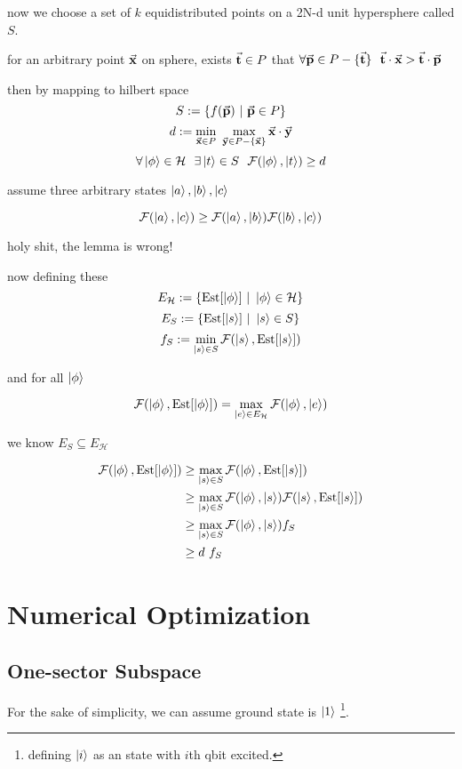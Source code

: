 \documentclass{article}
\DeclareMathOperator*{\est}{Est}
\begin{document}
now we choose a set of $k$ equidistributed points on a 2N-d unit hypersphere called $S$.

for an arbitrary point $\va{x}$ on sphere, exists $\va{t} \in P$ that $\forall \va{p} \in P - \{\va{t}\} ~~ \va{t}\cdot\va{x} > \va{t}\cdot \va{p}$

then by mapping to hilbert space
\[ S := \{ f(\va{p}) ~|~ \va{p} \in P \} \]
\[ d := \min_{\va{x} \in P} ~\max_{\va{y} \in P - \{\va{x}\}} \va{x}\cdot\va{y} \]
\[ \forall \ket{\phi} \in \mathcal{H} ~~ \exists \ket{t} \in S ~~ \mathcal{F}(\ket{\phi}, \ket{t}) \ge d \]

\begin{lemma}
assume three arbitrary states $\ket{a},\ket{b},\ket{c}$

\[ \mathcal{F}(\ket{a},\ket{c}) \ge \mathcal{F}(\ket{a},\ket{b})\mathcal{F}(\ket{b},\ket{c})\]
\end{lemma}

holy shit, the lemma is wrong!

now defining these
\[ E_{\mathcal{H}} := \{\est[\ket{\phi}] ~|~ \ket{\phi} \in \mathcal{H} \} \]
\[ E_S := \{\est[\ket{s}] ~|~ \ket{s} \in S \} \]
\[ f_S := \min_{\ket{s} \in S} \mathcal{F}(\ket{s}, \est[\ket{s}]) \] 

and for all $\ket{\phi}$

\[ \mathcal{F}(\ket{\phi}, \est[\ket{\phi}]) = \max_{\ket{e} \in E_{\mathcal{H}}} \mathcal{F}(\ket{\phi}, \ket{e})\]

we know $E_S \subseteq E_{\mathcal{H}}$

\begin{align*} \mathcal{F}(\ket{\phi}, \est[\ket{\phi}]) &\ge \max_{\ket{s} \in S} \mathcal{F}(\ket{\phi}, \est[\ket{s}]) \\ &\ge \max_{\ket{s} \in S} \mathcal{F} (\ket{\phi}, \ket{s})\mathcal{F}(\ket{s}, \est[\ket{s}]) 
\\ &\ge \max_{\ket{s} \in S} \mathcal{F} (\ket{\phi}, \ket{s}) f_S  
\\ &\ge d ~ f_S
\end{align*}

\section{Numerical Optimization}
\subsection{One-sector Subspace}
For the sake of simplicity, we can assume ground state is $\ket{1}$%
\footnote{defining $\ket{i}$ as an state with $i$th qbit excited.}.
\end{document}
